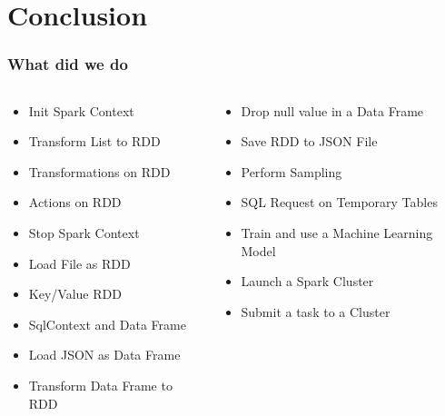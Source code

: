 \documentclass[slidetop,9pt,utf8]{beamer}
\begin{document}
\begin{CJK}{UTF8}{gbsn}
\begin{frame}
\end{frame}

%
%
%
%

\section{Conclusion}

\begin{frame}
  \frametitle{What did we do}

  \Large
  \begin{columns}[T] %
    \begin{column}{.48\textwidth}
      \begin{itemize}
        \item Init Spark Context
        \item Transform List to RDD
        \item Transformations on RDD
        \item Actions on RDD
        \item Stop Spark Context
        \item Load File as RDD
        \item Key/Value RDD
        \item SqlContext and Data Frame
        \item Load JSON as Data Frame
        \item Transform Data Frame to RDD
      \end{itemize}
    \end{column}%

    \hfill%
    \begin{column}{.48\textwidth}
      \begin{itemize}
        \item Drop null value in a Data Frame
        \item Save RDD to JSON File
        \item Perform Sampling
        \item SQL Request on Temporary Tables
        \item Train and use a Machine Learning Model
        \item Launch a Spark Cluster
        \item Submit a task to a Cluster
      \end{itemize}
    \end{column}%
  \end{columns}
  \normalsize
\end{frame}


\end{CJK}
\end{document}
